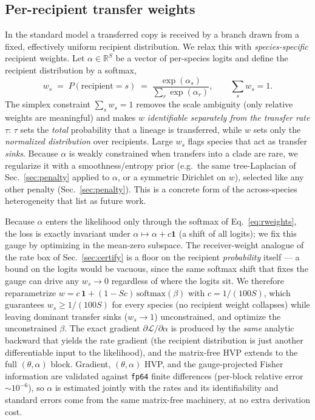 \documentclass[11pt]{article}
\newcommand{\btau}{\tau}
\newcommand{\NLL}{\mathcal{L}}
\newcommand{\Real}{\mathbb{R}}
\begin{document}
\subsection{Per-recipient transfer weights}
\label{sec:rweights}
In the standard model a transferred copy is received by a branch drawn from a
fixed, effectively uniform recipient distribution. We relax this with
\emph{species-specific} recipient weights. Let $\alpha\in\Real^{S}$ be a vector
of per-species logits and define the recipient distribution by a softmax,
\begin{equation}
  w_s \;=\; P(\text{recipient}=s) \;=\;
   \frac{\exp(\alpha_s)}{\sum_{r}\exp(\alpha_r)},
   \qquad \textstyle\sum_s w_s = 1 .
  \label{eq:rweights}
\end{equation}
The simplex constraint $\sum_s w_s=1$ removes the scale ambiguity (only relative
weights are meaningful) and makes $w$ \emph{identifiable separately from the
transfer rate} $\btau$: $\btau$ sets the \emph{total} probability that a lineage
is transferred, while $w$ sets only the \emph{normalized distribution} over
recipients. Large $w_s$ flags species that act as transfer \emph{sinks}. Because
$\alpha$ is weakly constrained when transfers into a clade are rare, we
regularize it with a smoothness/entropy prior (e.g.\ the same tree-Laplacian of
Sec.~\ref{sec:penalty} applied to $\alpha$, or a symmetric Dirichlet on $w$),
selected like any other penalty (Sec.~\ref{sec:penalty}). This is a concrete
form of the across-species heterogeneity that \citet{Morel2024} list as future
work.

Because $\alpha$ enters the likelihood only through the softmax of
Eq.~\eqref{eq:rweights}, the loss is exactly invariant under
$\alpha\!\mapsto\!\alpha+c\mathbf{1}$ (a shift of all logits); we fix this gauge
by optimizing in the mean-zero subspace. The receiver-weight analogue of the
rate box of Sec.~\ref{sec:certify} is a floor on the recipient \emph{probability}
itself --- a bound on the logits would be vacuous, since the same softmax shift
that fixes the gauge can drive any $w_s\!\to\!0$ regardless of where the logits
sit. We therefore reparametrize
$w = c\,\mathbf{1} + (1-Sc)\,\mathrm{softmax}(\beta)$ with $c=1/(100S)$, which
guarantees $w_s\!\ge\!1/(100S)$ for every species (no recipient weight collapses)
while leaving dominant transfer sinks ($w_s\!\to\!1$) unconstrained, and optimize
the unconstrained $\beta$. The exact gradient $\partial\NLL/\partial\alpha$ is
produced by the \emph{same} analytic backward that yields the rate gradient (the
recipient distribution is just another differentiable input to the likelihood),
and the matrix-free HVP extends to the full $(\theta,\alpha)$ block. Gradient,
$(\theta,\alpha)$ HVP, and the gauge-projected Fisher information are validated
against \texttt{fp64} finite differences (per-block relative error
$\sim\!10^{-6}$), so $\alpha$ is estimated jointly with the rates and its
identifiability and standard errors come from the same matrix-free machinery, at
no extra derivation cost.
\end{document}
